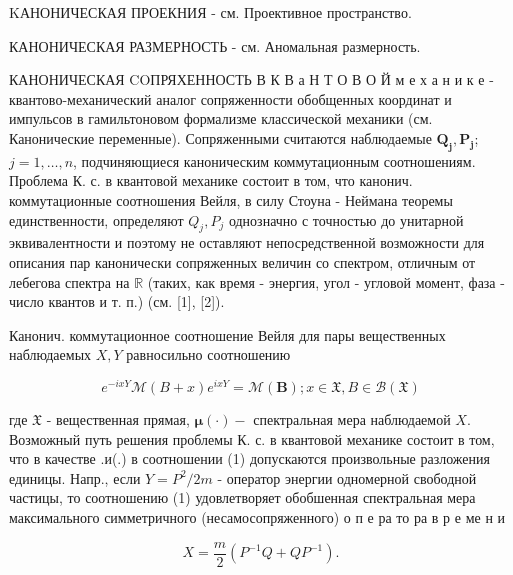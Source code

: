 \documentclass[10pt]{article}
\begin{document}
KАНОНИЧЕСКАЯ ПРОЕКНИЯ - см. Проективное пространство.



КАНОНИЧЕСКАЯ РАЗМЕРНОСТЬ - см. Аномальная размерность.



КАНОНИЧЕСКАЯ COПРЯХЕННОСТЬ В К В а Н Т О В О Й м е х а н и к е - квантово-механический аналог сопряженности обобщенных координат и импульсов в гамильтоновом формализме классической механики (см. Канонические переменные). Сопряженными считаются наблюдаемые $\boldsymbol{Q}_{\boldsymbol{j}}, \boldsymbol{P}_{\boldsymbol{j}}$; $j=1, \ldots, n$, подчиняющиеся каноническим коммутационным соотношениям. Проблема К. с. в квантовой механике состоит в том, что канонич. коммутационные соотношения Вейля, в силу Стоуна - Неймана теоремы единственности, определяют $Q_{j}, P_{j}$ однозначно с точностью до унитарной эквивалентности и поэтому не оставляют непосредственной возможности для описания пар канонически сопряженных величин со спектром, отличным от лебегова спектра на $\mathbb{R}$ (таких, как время - энергия, угол - угловой момент, фаза - число квантов и т. п.) (см. [1], [2]).



Канонич. коммутационное соотношение Вейля для пары вещественных наблюдаемых $X, Y$ равносильно соотношению



\[

e^{-i x Y} \mathscr{M}(B+x) e^{i x Y}=\mathscr{M}(\boldsymbol{B}) ; x \in \mathfrak{X}, B \in \mathscr{B}(\mathfrak{X})

\]



где $\mathfrak{X}$ - вещественная прямая, $\boldsymbol{\mu}(\cdot)-$ спектральная мера наблюдаемой $X$. Возможный путь решения проблемы К. с. в квантовой механике состоит в том, что в качестве .и(.) в соотношении (1) допускаются произвольные разложения единицы. Напр., если $Y=P^{2} / 2 m$ - оператор энергии одномерной свободной частицы, то соотношению (1) удовлетворяет обобшенная спектральная мера максимального симметричного (несамосопряженного) о п е ра то ра в р е ме н и



\[

X=\frac{m}{2}\left(P^{-1} Q+Q P^{-1}\right) .

\]
\end{document}
